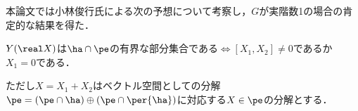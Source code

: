 本論文では小林俊行氏による次の予想について考察し，$G$が実階数1の場合の肯定的な結果を得た．
\begin{yosou*}
    $Y(\real X)$は$ \ha\cap \pe$の有界な部分集合である$ \iff   [X_1, X_2]\neq 0 $であるか$X_1 = 0$である．

  ただし$X = X_1 + X_2 $はベクトル空間としての分解$\pe =(\pe\cap \ha)\oplus(\pe\cap\per{\ha}) $に対応する$X\in \pe$の分解とする．
\end{yosou*}

